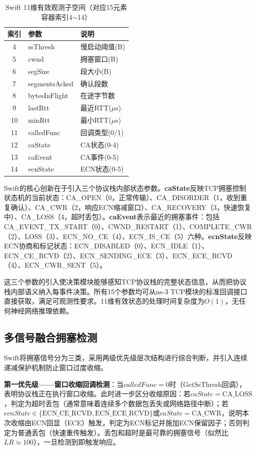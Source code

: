 \documentclass[10pt,twocolumn]{article}
\begin{document}
\begin{table}[htbp]
\centering
\caption{Swift 11维有效观测子空间（对应15元素容器索引4$\sim$14）}
\label{tab:observation}
\small
\begin{tabular}{clp{3.2cm}}
\toprule
\textbf{索引} & \textbf{参数} & \textbf{说明} \\
\midrule
4  & ssThresh & 慢启动阈值(B) \\
5  & cwnd & 拥塞窗口(B) \\
6  & segSize & 段大小(B) \\
7  & segmentsAcked & 确认段数 \\
8  & bytesInFlight & 在途字节数 \\
9  & lastRtt & 最近RTT($\mu$s) \\
10 & minRtt & 最小RTT($\mu$s) \\
11 & calledFunc & 回调类型(0/1) \\
12 & caState & CA状态(0-4) \\
13 & caEvent & CA事件(0-5) \\
14 & ecnState & ECN状态(0-5) \\
\bottomrule
\end{tabular}
\end{table}

Swift的核心创新在于引入三个协议栈内部状态参数。\textbf{caState}反映TCP拥塞控制状态机的当前状态：CA\_OPEN（0，正常传输）、CA\_DISORDER（1，收到重复确认）、CA\_CWR（2，响应ECN缩减窗口）、CA\_RECOVERY（3，快速恢复中）、CA\_LOSS（4，超时丢包）。\textbf{caEvent}表示最近的拥塞事件：包括CA\_EVENT\_TX\_START（0）、CWND\_RESTART（1）、COMPLETE\_CWR（2）、LOSS（3）、ECN\_NO\_CE（4）、ECN\_IS\_CE（5）六种。\textbf{ecnState}反映ECN协商和标记状态：ECN\_DISABLED（0）、ECN\_IDLE（1）、ECN\_CE\_RCVD（2）、ECN\_SENDING\_ECE（3）、ECN\_ECE\_RCVD（4）、ECN\_CWR\_SENT（5）。

这三个参数的引入使决策模块能够感知TCP协议栈的完整状态信息，从而把协议栈内部语义纳入每事件决策。所有15个参数均可从ns-3 TCP模块的标准回调接口直接获取，满足可观测性要求。11维有效状态的处理时间复杂度为$O(1)$，无任何神经网络推理依赖。

\subsection{多信号融合拥塞检测}

Swift将拥塞信号分为三类，采用两级优先级层次结构进行综合判断，并引入连续递减保护机制防止窗口过度收缩。

\textbf{第一优先级——窗口收缩回调检测}：当$calledFunc = 0$时（GetSsThresh回调），表明协议栈正在执行窗口收缩。此时进一步区分收缩原因：若$caState = \text{CA\_LOSS}$，判定为超时丢包（通常意味着连续多个数据包丢失或网络路径中断）；若$ecnState \in \{\text{ECN\_CE\_RCVD}, \text{ECN\_ECE\_RCVD}\}$或$caState = \text{CA\_CWR}$，说明本次收缩由ECN回显（ECE）触发，判定为ECN标记并施加ECN保留因子；否则判定为普通丢包（快速重传触发）。丢包和超时是最可靠的拥塞信号（似然比$LR \approx 100$），一旦检测到即触发响应。
\end{document}
